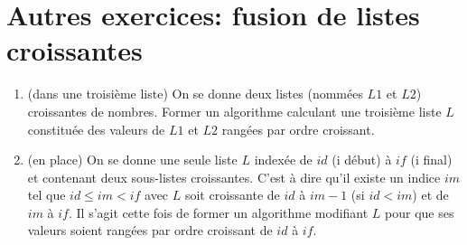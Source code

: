 \section{Autres exercices: fusion de listes croissantes}
\begin{enumerate}
  \item (dans une troisième liste) On se donne deux listes (nommées $L1$ et $L2$) croissantes de nombres. Former un algorithme calculant une troisième liste $L$ constituée des valeurs de $L1$ et $L2$ rangées par ordre croissant.
  
  \item (en place) On se donne une seule liste $L$ indexée de $id$ (i début) à $if$ (i final) et contenant deux sous-listes croissantes. C'est à dire qu'il existe un indice $im$ tel que $id \leq im < if$ avec $L$ soit croissante de $id$ à $im -1$ (si $id < im$) et de $im$ à $if$. Il s'agit cette fois de former un algorithme modifiant $L$ pour que ses valeurs soient rangées par ordre croissant de $id$ à $if$.
\end{enumerate}

